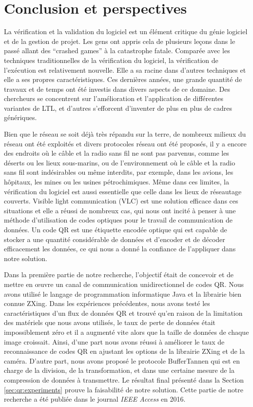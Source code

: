 
\chapter{Conclusion et perspectives}

La vérification et la validation du logiciel est un élément critique du génie logiciel et de la gestion de projet. Les gens ont appris cela de plusieurs leçons dans le passé allant des ``crashed games'' à la catastrophe fatale. Comparée avec les techniques traditionnelles de la vérification du logiciel, la vérification de l'exécution est relativement nouvelle. Elle a sa racine dans d'autres techniques et elle a ses propres caractéristiques. Ces dernières années, une grande quantité de travaux et de temps ont été investis dans divers aspects de ce domaine. Des chercheurs se concentrent sur l'amélioration et l'application de différentes variantes de LTL, et d'autres s'efforcent d'inventer de plus en plus de cadres génériques.

Bien que le réseau se soit déjà très répandu sur la terre, de nombreux milieux du réseau ont été exploités et divers protocoles réseau ont été proposés, il y a encore des endroits où le câble et la radio sans fil ne sont pas parvenus, comme les déserts ou les lieux sous-marins, ou de l'environnement où le câble et la radio sans fil sont indésirables ou même interdits, par exemple, dans les avions, les hôpitaux, les mines ou les usines pétrochimiques. Même dans ces limites, la vérification du logiciel est aussi essentielle que celle dans les lieux de réseautage couverts. Visible light communication (VLC) est une solution efficace dans ces situations et elle a réussi de nombreux cas, qui nous ont incité à penser à une méthode d'utilisation de codes optiques pour le travail de communication de données. Un code QR est une étiquette encodée optique qui est capable de stocker a une quantité considérable de données et d'encoder et de décoder efficacement les données, ce qui nous a donné la confiance de l'appliquer dans notre solution.

Dans la première partie de notre recherche, l'objectif était de concevoir et de mettre en \oe{}uvre un canal de communication unidirectionnel de codes QR. Nous avons utilisé le langage de programmation informatique Java et la librairie bien connue ZXing. Dans les expériences précédentes, nous avons testé les caractéristiques d'un flux de données QR et trouvé qu'en raison de la limitation des matériels que nous avons utilisés, le taux de perte de données était impossiblement zéro et il a augmenté vite alors que la taille de données de chaque image croissait. Ainsi, d'une part nous avons réussi à améliorer le taux de reconnaissance de codes QR en ajustant les options de la librairie ZXing et de la caméra. D'autre part, nous avons proposé le protocole BufferTannen qui est en charge de la division, de la transformation, et dans une certaine mesure de la compression de données à transmettre. Le résultat final présenté dans la Section \ref{sec:qr:experiments} prouve la faisabilité de notre solution. Cette partie de notre recherche a été publiée dans le journal \textit{IEEE Access} en 2016.


